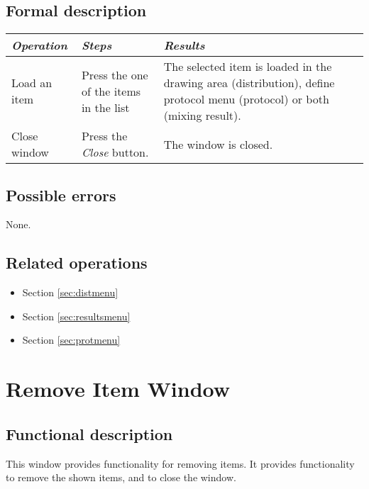   \subsection*{Formal description}
    \begin{tabularx}{\textwidth}{XXX}
    \toprule
    \emph{Operation} & \emph{Steps} & \emph{Results} \\
    \midrule
    Load an item & Press the one of the items in the list & The selected item is loaded in the drawing area (distribution), define protocol menu (protocol) or both (mixing result). \\
    \midrule
    Close window & Press the \emph{Close} button. & The window is closed. \\
    \bottomrule
\end{tabularx}

  \subsection*{Possible errors}
  None.

  \subsection*{Related operations}
   \begin{itemize}
   \item Section \ref{sec:distmenu}
   \item Section \ref{sec:resultsmenu}
   \item Section \ref{sec:protmenu}
  \end{itemize}

\section{Remove Item Window}
\label{sec:removeitem}
  \subsection*{Functional description}
  This window provides functionality for removing items. It provides functionality to remove the shown items, and to close the window.

